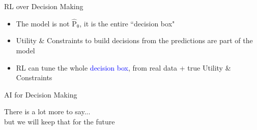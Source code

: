 \documentclass[lecture]{beamer}
\newcommand{\vect}[1]{\ensuremath{\boldsymbol{\mathrm{#1}}}}
\begin{document}
\begin{frame}{\normalsize RL over Decision Making}
\vspace{-.25cm}
\begin{itemize}
\item The model is not $\hat{\mathrm P}_{\vect \theta}$, it is the entire ``decision box"
\item Utility \& Constraints to build decisions from the predictions are part of the model
\item RL can tune the whole \textcolor{blue}{decision box}, from real data + true Utility \& Constraints 
\end{itemize}




\end{frame}


\begin{frame}{\normalsize AI for Decision Making}
\footnotesize

\huge

\center
There is a lot more to say...\\
but we will keep that for the future

\end{frame}
\end{document}
